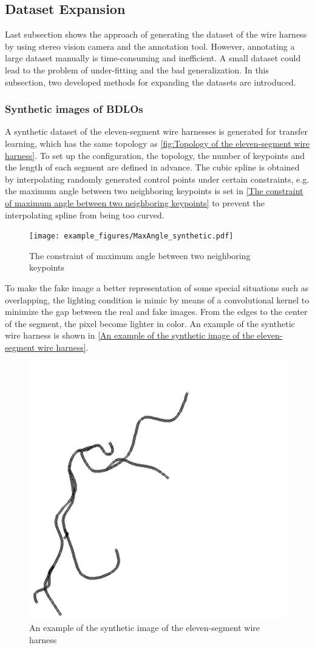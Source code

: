 \subsection{Dataset Expansion}
    Last subsection shows the approach of generating the dataset of the wire harness by using stereo vision camera and the annotation tool. However, annotating a large  
    dataset manually is time-consuming and inefficient. A small dataset could lead to the problem of under-fitting and the bad generalization. In this subsection, two 
    developed methods for expanding the datasets are introduced. 
\subsubsection{Synthetic images of BDLOs}
    A synthetic dataset of the eleven-segment wire harnesses is generated for transfer learning, which has the same topology as \autoref{fig:Topology of the eleven-segment wire harness}.
    To set up the configuration, the topology, the number of keypoints and the length of each segment are defined in advance. The cubic spline is obtained by interpolating randomly generated 
    control points under certain constraints, e.g. the maximum angle between two neighboring keypoints is set in \autoref{The constraint of maximum angle between two neighboring keypoints}
    to prevent the interpolating spline from being too curved. 
    \begin{figure}[!htbp]
        \centering
        \texttt{[image: example\_figures/MaxAngle\_synthetic.pdf]}
        \caption{The constraint of maximum angle between two neighboring keypoints}
        \label{The constraint of maximum angle between two neighboring keypoints}
    \end{figure}
    To make the fake image a better representation of some special situations such as overlapping, the lighting condition is mimic
    by means of a convolutional kernel to minimize the gap between the real and fake images. From the edges to the center of the segment, the pixel become lighter in color. An example of the 
    synthetic wire harness is shown in \autoref{An example of the synthetic image of the eleven-segment wire harness}.
    \begin{figure}[!htbp]
        \centering
        \includegraphics[width=0.4\linewidth]{example_figures/fakeimg.png}
        \caption{An example of the synthetic image of the eleven-segment wire harness}
        \label{An example of the synthetic image of the eleven-segment wire harness}
    \end{figure}

